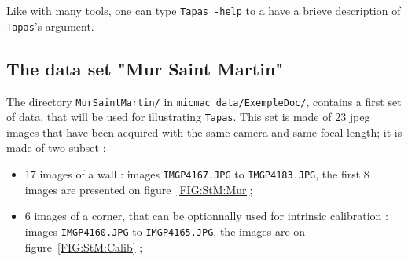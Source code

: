 Like with many tools, one can type {\tt Tapas -help} to a have a brieve description
of {\tt Tapas}'s argument.


\subsection{The data set  "Mur Saint Martin"}



The directory {\tt MurSaintMartin/} in {\tt micmac\_data/ExempleDoc/}, contains
a first set of data, that will be used for illustrating {\tt Tapas}.
This set is made of $23$ jpeg images that have been acquired with the same
camera and same focal length; it is made of two subset :

\begin{itemize}
    \item $17$ images of a wall : images {\tt IMGP4167.JPG} to {\tt IMGP4183.JPG}, the first
          $8$ images are presented on figure~\ref{FIG:StM:Mur};
    \item $6$ images of a corner, that can be optionnally used for intrinsic calibration
           : images {\tt IMGP4160.JPG} to {\tt IMGP4165.JPG}, the images are on figure~\ref{FIG:StM:Calib} ;
\end{itemize}



